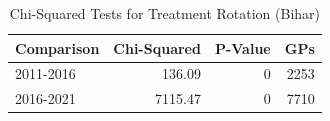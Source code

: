 \begin{table}[!h]
\centering
\caption{\label{tab:chi_sq_bh}Chi-Squared Tests for Treatment Rotation (Bihar)}
\centering
\fontsize{8}{10}\selectfont
\begin{tabular}[t]{lrrr}
\toprule
Comparison & Chi-Squared & P-Value & GPs\\
\midrule
2011-2016 & 136.09 & 0 & 2253\\
2016-2021 & 7115.47 & 0 & 7710\\
\bottomrule
\end{tabular}
\end{table}
